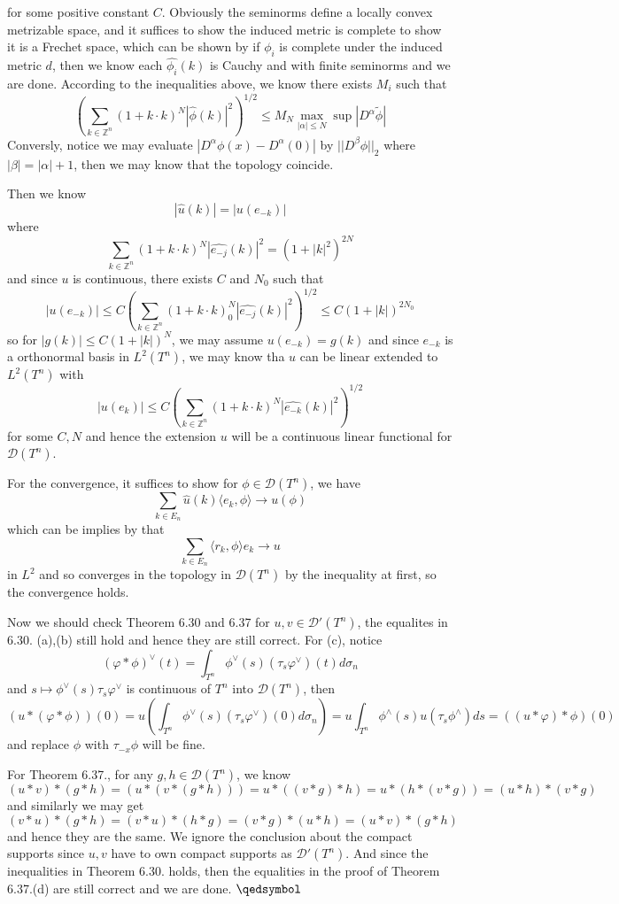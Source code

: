\documentclass[lang=en,11pt,a4paper,citestyle =authoryear]{elegantpaper}
\newcommand{\prvd}{$\hfill \qedsymbol$}
\newcommand{\Z}{\mathbb{Z}}
\newcommand{\D}{\mathscr{D}}
\begin{document}
for some positive constant $C$. Obviously the seminorms define a locally convex metrizable space, and it suffices to show the induced metric is complete to show it is a Frechet space, which can be shown by if $\phi_i$ is complete under the induced metric $d$, then we know each $\hat{\phi_i}(k)$ is Cauchy and with finite seminorms and we are done. According to the inequalities above, we know there exists $M_i$ such that
\[
(\sum\limits_{k\in\Z^n}(1+k\cdot k)^N |\hat{\phi}(k)|^2)^{1/2} \leq M_N \max_{|\alpha| \leq N} \sup|D^{\alpha}\tilde{\phi}|
\]
Conversly, notice we may evaluate $|D^{\alpha}\phi(x) - D^{\alpha}(0)|$ by $||D^{\beta} \phi||_2$ where $|\beta| = |\alpha| + 1$, then we may know that the topology coincide.\par
Then we know
\[
|\hat{u}(k)| = |u(e_{-k})|
\]
where
\[
\sum\limits_{k\in\Z^n}(1+k\cdot k)^N|\hat{e_{-j}}(k)|^2 = (1+|k|^2)^{2N}
\]
and since $u$ is continuous, there exists $C$ and $N_0$ such that
\[
|u(e_{-k})| \leq C(\sum\limits_{k\in\Z^n}(1+k\cdot k)^N_0|\hat{e_{-j}}(k)|^2)^{1/2} \leq C(1+|k|)^{2N_0}
\]
so for $|g(k)| \leq C(1+|k|)^N$, we may assume $u(e_{-k}) = g(k)$ and since $e_{-k}$ is a orthonormal basis in $L^2(T^n)$, we may know tha $u$ can be linear extended to $L^2(T^n)$ with
\[
|u(e_k)| \leq C(\sum\limits_{k\in\Z^n}(1+k\cdot k)^N |\hat{e_{-k}}(k)|^2)^{1/2}
\]
for some $C,N$ and hence the extension $u$ will be a continuous linear functional for $\D(T^n)$.\par
For the convergence, it suffices to show for $\phi \in \D(T^n)$, we have
\[
\sum\limits_{k\in E_n} \hat{u}(k)\langle e_k,\phi\rangle \to u(\phi)
\]
which can be implies by that
\[
\sum\limits_{k\in E_n} \langle r_k,\phi\rangle e_k \to u
\]
in $L^2$ and so converges in the topology in $\D(T^n)$ by the inequality at first, so the convergence holds.\par
Now we should check Theorem 6.30 and 6.37 for $u,v\in \D'(T^n)$, the equalites in 6.30. (a),(b) still hold and hence they are still correct. For (c), notice
\[
(\varphi * \phi)^{\vee}(t) = \int_{T^n} \phi^{\vee}(s)(\tau_s \varphi^{\vee})(t) d\sigma_n
\]
and $s\mapsto \phi^{\vee}(s)\tau_s\varphi^{\vee}$ is continuous of $T^n$ into $\D(T^n)$, then
\[
(u*(\varphi*\phi))(0) = u(\int_{T^n} \phi^{\vee}(s)(\tau_s \varphi^{\vee})(0) d\sigma_n) = u\int_{T^n}\phi^{\wedge}(s)u(\tau_s\phi^{\wedge}) ds = ((u*\varphi)*\phi)(0)
\]
and replace $\phi$ with $\tau_{-x}\phi$ will be fine.\par
For Theorem 6.37., for any $g,h\in\D(T^n)$, we know
\[
(u*v)*(g*h) = (u*(v*(g*h))) = u*((v*g)*h) = u*(h*(v*g)) = (u*h)*(v*g)
\]
and similarly we may get
\[
(v*u)*(g*h) = (v*u)*(h*g) = (v*g)*(u*h) = (u*v)*(g*h)
\]
and hence they are the same. We ignore the conclusion about the compact supports since $u,v$ have to own compact supports as $\D'(T^n)$. And since the inequalities in Theorem 6.30. holds, then the equalities in the proof of Theorem 6.37.(d) are still correct and we are done.
\prvd

\addappheadtotoc
\end{document}
